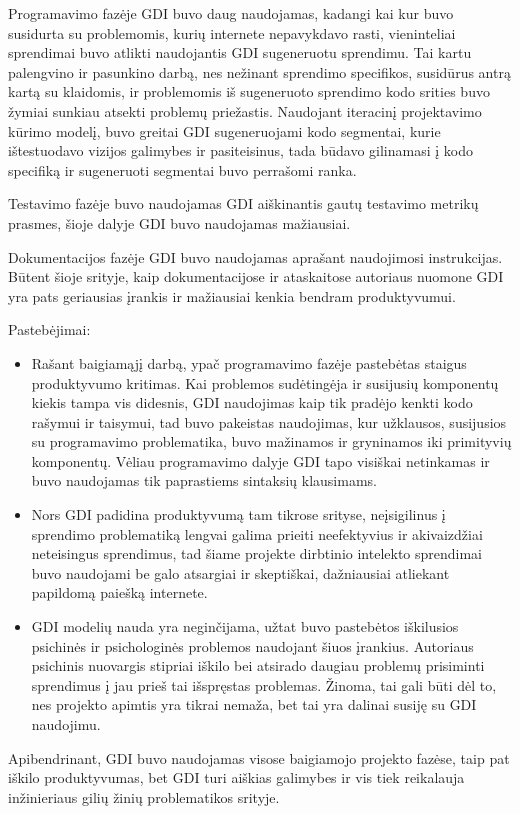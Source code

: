 Programavimo fazėje GDI buvo daug naudojamas, kadangi kai kur buvo susidurta su problemomis, kurių internete nepavykdavo rasti, vieninteliai sprendimai buvo atlikti naudojantis GDI sugeneruotu sprendimu. Tai kartu palengvino ir pasunkino darbą, nes nežinant sprendimo specifikos, susidūrus antrą kartą su klaidomis, ir problemomis iš sugeneruoto sprendimo kodo srities buvo žymiai sunkiau atsekti problemų priežastis. Naudojant iteracinį projektavimo kūrimo modelį, buvo greitai GDI sugeneruojami kodo segmentai, kurie ištestuodavo vizijos galimybes ir pasiteisinus, tada būdavo gilinamasi į kodo specifiką ir sugeneruoti segmentai buvo perrašomi ranka.

Testavimo fazėje buvo naudojamas GDI aiškinantis gautų testavimo metrikų prasmes, šioje dalyje GDI buvo naudojamas mažiausiai.

Dokumentacijos fazėje GDI buvo naudojamas aprašant naudojimosi instrukcijas. Būtent šioje srityje, kaip dokumentacijose ir ataskaitose autoriaus nuomone GDI yra pats geriausias įrankis ir mažiausiai kenkia bendram produktyvumui.

Pastebėjimai:
\begin{itemize}
	\item Rašant baigiamąjį darbą, ypač programavimo fazėje pastebėtas staigus produktyvumo kritimas. Kai problemos sudėtingėja ir susijusių komponentų kiekis tampa vis didesnis, GDI naudojimas kaip tik pradėjo kenkti kodo rašymui ir taisymui, tad buvo pakeistas naudojimas, kur užklausos, susijusios su programavimo problematika, buvo mažinamos ir gryninamos iki primityvių komponentų. Vėliau programavimo dalyje GDI tapo visiškai netinkamas ir buvo naudojamas tik paprastiems sintaksių klausimams.
	\item Nors GDI padidina produktyvumą tam tikrose srityse, neįsigilinus į sprendimo problematiką lengvai galima prieiti neefektyvius ir akivaizdžiai neteisingus sprendimus, tad šiame projekte dirbtinio intelekto sprendimai buvo naudojami be galo atsargiai ir skeptiškai, dažniausiai atliekant papildomą paiešką internete.
	\item GDI modelių nauda yra neginčijama, užtat buvo pastebėtos iškilusios psichinės ir psichologinės problemos naudojant šiuos įrankius. Autoriaus psichinis nuovargis stipriai iškilo bei atsirado daugiau problemų prisiminti sprendimus į jau prieš tai išspręstas problemas. Žinoma, tai gali būti dėl to, nes projekto apimtis yra tikrai nemaža, bet tai yra dalinai susiję su GDI naudojimu.
\end{itemize}

Apibendrinant, GDI buvo naudojamas visose baigiamojo projekto fazėse, taip pat iškilo produktyvumas, bet GDI turi aiškias galimybes ir vis tiek reikalauja inžinieriaus gilių žinių problematikos srityje.
